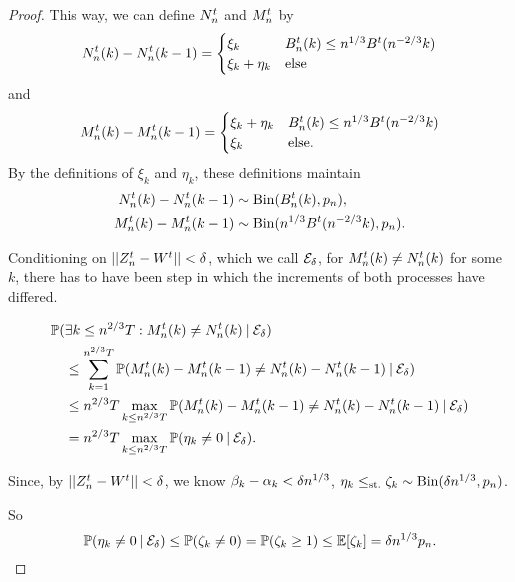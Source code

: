 \begin{proof}
This way, we can define $N_n^t$ and $M_n^t$ by
\begin{equation*}
N_n^t(k) - N_n^t(k-1) = 
\begin{cases}
\xi_k & B_n^t(k) \leq n^{1 / 3}B^t(n^{-2 / 3}k) \\
\xi_k + \eta_k &\text{else}
\end{cases}
\end{equation*}
and
\begin{equation*}
M_n^t(k) - M_n^t(k-1) = 
\begin{cases}
\xi_k + \eta_k & B_n^t(k) \leq n^{1 / 3}B^t(n^{-2 / 3}k) \\
\xi_k &\text{else}.
\end{cases}
\end{equation*}
By the definitions of $\xi_k$ and $\eta_k$,
these definitions maintain
\begin{equation}
\begin{aligned}
N_n^t(k) - N_n^t(k-1) &\sim \operatorname*{Bin}(B_n^t(k), p_n), \\
M_n^t(k) - M_n^t(k-1) &\sim \operatorname*{Bin}(n^{1 / 3} B^t(n^{-2 / 3}k), p_n).
\end{aligned}
\end{equation}

Conditioning on $||Z_n^t - W^t|| < \delta$, which we call $\mathcal{E}_{\delta}$,
for $M_n^t(k) \neq N_n^t(k)$ for some $k$,
there has to have been step in which the increments of both processes have differed.

\begin{align*}
&\mathbb{P}(\exists k\leq n^{2 / 3}T: M_n^t(k) \neq N_n^t(k) \: | \: \mathcal{E}_{\delta}) \\
&\quad \leq \sum_{k=1}^{n^{2 / 3}T} \mathbb{P}( M_n^t(k) - M_n^t(k-1) \neq N_n^t(k) - N_n^t(k-1) \: | \: \mathcal{E}_{\delta}) \\
&\quad \leq n^{2 / 3}T \max_{k \leq n^{2 / 3}T} \mathbb{P}(M_n^t(k) - M_n^t(k-1) \neq N_n^t(k) - N_n^t(k-1) \: | \: \mathcal{E}_{\delta}) \\
&\quad = n^{2 / 3}T \max_{k \leq n^{2 / 3}T} \mathbb{P}( \eta_k \neq 0 \: | \: \mathcal{E}_{\delta} ).
\end{align*}

Since, by $||Z_n^t - W^t|| < \delta$, we know $\beta_k - \alpha_k < \delta n^{1 / 3}$,
$\eta_k \leq_{\text{st.}} \zeta_k \sim \operatorname*{Bin}(\delta n^{1 / 3}, p_n)$.

So 
\begin{equation}
\mathbb{P}( \eta_k \neq 0 \: | \: \mathcal{E}_{\delta} ) \leq \mathbb{P}( \zeta_k \neq 0) = \mathbb{P}( \zeta_k \geq 1 ) \leq \mathbb{E}[\zeta_k] = \delta n^{1 / 3}p_n.
\end{equation}


\end{proof}
